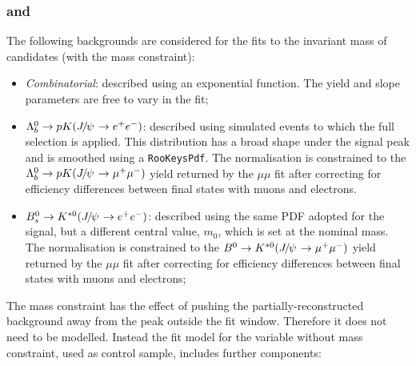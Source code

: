 \subsubsection*{\BdToKstJPs and \BdToKstPsi}

The following backgrounds are considered for the fits to the invariant mass of \BdToKstJPsee candidates
(with the \jpsi mass constraint):
%
\begin{itemize}

\item \textit{Combinatorial}: described using an exponential function. The yield and slope parameters are free to vary in the fit;

\item $\Lb\to pK(\jpsi\to\ee)$: described using simulated events to which the full selection is applied. This distribution has a broad shape under the signal peak and is smoothed using a \texttt{RooKeysPdf}. The normalisation is constrained to the $\Lb\to pK(\jpsi\to\mumu)$ yield returned by the $\mu\mu$ fit after correcting for efficiency differences between final states with muons and electrons.

\item $\Bs\to\Kstarz(\jpsi\to\ee)$: described using the same PDF adopted for the signal, but a different central value, $m_0$, which is set at the \Bs nominal mass. The normalisation is constrained to the $\Bd\to\Kstarz(\jpsi\to\mumu)$ yield returned by the $\mu\mu$ fit after correcting for efficiency differences between final states with muons and electrons;

\end{itemize}

The \jpsi mass constraint has the effect of pushing the partially-reconstructed background away from 
the peak outside the fit window. Therefore it does not need to be modelled.
Instead the fit model for the variable without \jpsi mass constraint, used as control sample, includes further components:

